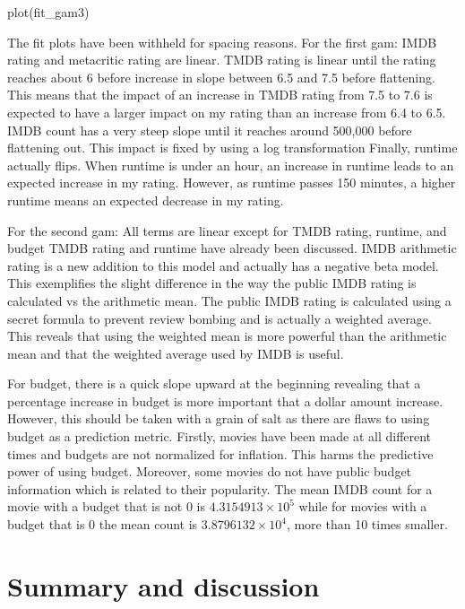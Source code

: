 \documentclass[
]{article}
\newenvironment{Shaded}{\begin{snugshade}}{\end{snugshade}}
\newcommand{\FunctionTok}[1]{\textcolor[rgb]{0.00,0.00,0.00}{#1}}
\newcommand{\NormalTok}[1]{#1}
\begin{document}
\begin{Shaded}
\begin{Highlighting}[]
\FunctionTok{plot}\NormalTok{(fit\_gam3)}
\end{Highlighting}
\end{Shaded}

The fit plots have been withheld for spacing reasons. For the first gam:
IMDB rating and metacritic rating are linear. TMDB rating is linear
until the rating reaches about 6 before increase in slope between 6.5
and 7.5 before flattening. This means that the impact of an increase in
TMDB rating from 7.5 to 7.6 is expected to have a larger impact on my
rating than an increase from 6.4 to 6.5. IMDB count has a very steep
slope until it reaches around 500,000 before flattening out. This impact
is fixed by using a log transformation Finally, runtime actually flips.
When runtime is under an hour, an increase in runtime leads to an
expected increase in my rating. However, as runtime passes 150 minutes,
a higher runtime means an expected decrease in my rating.

For the second gam: All terms are linear except for TMDB rating,
runtime, and budget TMDB rating and runtime have already been discussed.
IMDB arithmetic rating is a new addition to this model and actually has
a negative beta model. This exemplifies the slight difference in the way
the public IMDB rating is calculated vs the arithmetic mean. The public
IMDB rating is calculated using a secret formula to prevent review
bombing and is actually a weighted average. This reveals that using the
weighted mean is more powerful than the arithmetic mean and that the
weighted average used by IMDB is useful.

For budget, there is a quick slope upward at the beginning revealing
that a percentage increase in budget is more important that a dollar
amount increase. However, this should be taken with a grain of salt as
there are flaws to using budget as a prediction metric. Firstly, movies
have been made at all different times and budgets are not normalized for
inflation. This harms the predictive power of using budget. Moreover,
some movies do not have public budget information which is related to
their popularity. The mean IMDB count for a movie with a budget that is
not 0 is \ensuremath{4.3154913\times 10^{5}} while for movies with a
budget that is 0 the mean count is \ensuremath{3.8796132\times 10^{4}},
more than 10 times smaller.

\hypertarget{summary-and-discussion}{%
\section{Summary and discussion}\label{summary-and-discussion}}
\end{document}
